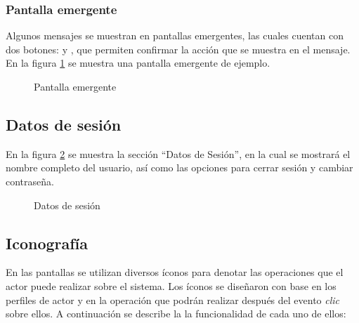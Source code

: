   \subsubsection{Pantalla emergente}
    Algunos mensajes se muestran en pantallas emergentes, las cuales cuentan con dos botones:  y , que permiten confirmar la acción que se muestra en el mensaje.
    En la figura \ref{fig:pantallaEmergente} se muestra una pantalla emergente de ejemplo.
      \begin{figure}[htbp!]
        \centering
	  \caption{Pantalla emergente}
	  \label{fig:pantallaEmergente}
      \end{figure}
  
\subsection{Datos de sesión}
\label{ch:Interaccion:DatosSesion}

En la figura \ref{fig:sesion} se muestra la sección ``Datos de Sesión'', en la cual se mostrará el nombre completo del usuario, así como las opciones para cerrar sesión y cambiar contraseña.
\begin{figure}[htbp!]
    \begin{center}
	\caption{Datos de sesión}
	\label{fig:sesion}
    \end{center}
\end{figure}


\subsection{Iconografía}

  En las pantallas se utilizan diversos íconos para denotar las operaciones que el actor puede realizar sobre el sistema. Los íconos se diseñaron con base en los perfiles de actor y en la operación que podrán realizar 
  después del evento {\it clic} sobre ellos.  A continuación se describe la la funcionalidad de cada uno de ellos:\\\\

